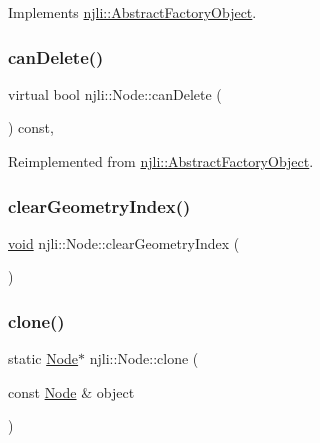 \begin{DoxyCodeInclude}
\end{DoxyCodeInclude}


Implements \mbox{\hyperlink{classnjli_1_1_abstract_factory_object_a4763d05bc9dc37c559111f8bb30e1dd8}{njli\+::\+Abstract\+Factory\+Object}}.

\mbox{\label{classnjli_1_1_node_a23f6a6a0cf8fd344d0687f4e35de7e98}} 
\subsubsection{\texorpdfstring{can\+Delete()}{canDelete()}}
{\footnotesize\ttfamily virtual bool njli\+::\+Node\+::can\+Delete (\begin{DoxyParamCaption}{ }\end{DoxyParamCaption}) const\hspace{0.3cm}{\ttfamily [protected]}, {\ttfamily [virtual]}}



Reimplemented from \mbox{\hyperlink{classnjli_1_1_abstract_factory_object_aaa088eb7160046ccf467c0f29f509291}{njli\+::\+Abstract\+Factory\+Object}}.

\mbox{\label{classnjli_1_1_node_a0a07c5e7c436ed50072c78f4e7ed6d62}} 
\subsubsection{\texorpdfstring{clear\+Geometry\+Index()}{clearGeometryIndex()}}
{\footnotesize\ttfamily \mbox{\hyperlink{_thread_8h_af1e856da2e658414cb2456cb6f7ebc66}{void}} njli\+::\+Node\+::clear\+Geometry\+Index (\begin{DoxyParamCaption}{ }\end{DoxyParamCaption})\hspace{0.3cm}{\ttfamily [protected]}}

\mbox{\label{classnjli_1_1_node_acb3d3885f7798ef44a1636a290acae51}} 
\subsubsection{\texorpdfstring{clone()}{clone()}}
{\footnotesize\ttfamily static \mbox{\hyperlink{classnjli_1_1_node}{Node}}$\ast$ njli\+::\+Node\+::clone (\begin{DoxyParamCaption}\item[{const \mbox{\hyperlink{classnjli_1_1_node}{Node}} \&}]{object }\end{DoxyParamCaption})\hspace{0.3cm}{\ttfamily [static]}}



